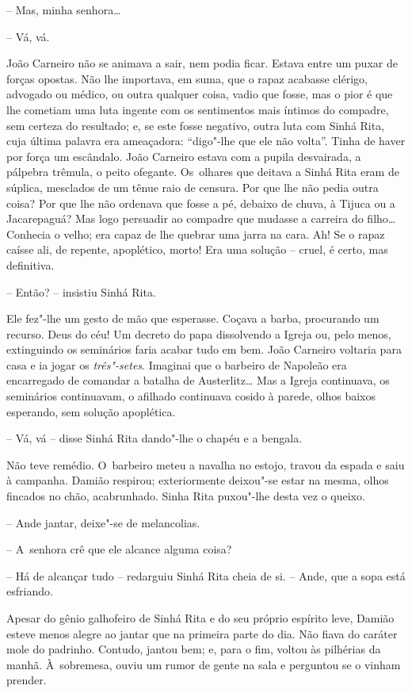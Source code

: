 -- Mas, minha senhora\ldots{}

-- Vá, vá.

João Carneiro não se animava a sair, nem podia ficar. Estava entre um
puxar de forças opostas. Não lhe importava, em suma, que o rapaz
acabasse clérigo, advogado ou médico, ou outra qualquer coisa, vadio que
fosse, mas o pior é que lhe cometiam uma luta ingente com os sentimentos
mais íntimos do compadre, sem certeza do resultado; e, se este fosse
negativo, outra luta com Sinhá Rita, cuja última palavra era ameaçadora:
``digo"-lhe que ele não volta''. Tinha de haver por força um escândalo.
João Carneiro estava com a pupila desvairada, a pálpebra trêmula, o
peito ofegante. Os~olhares que deitava a Sinhá Rita eram de súplica,
mesclados de um tênue raio de censura. Por que lhe não pedia outra
coisa? Por que lhe não ordenava que fosse a pé, debaixo de chuva, à
Tijuca ou a Jacarepaguá? Mas logo persuadir ao compadre que mudasse a
carreira do filho\ldots{} Conhecia o velho; era capaz de lhe quebrar uma
jarra na cara. Ah! Se o rapaz caísse ali, de repente, apoplético, morto!
Era uma solução -- cruel, é certo, mas definitiva.

-- Então? -- insistiu Sinhá Rita.

Ele fez"-lhe um gesto de mão que esperasse. Coçava a barba, procurando um
recurso. Deus do céu! Um decreto do papa dissolvendo a Igreja ou, pelo
menos, extinguindo os seminários faria acabar tudo em bem. João Carneiro
voltaria para casa e ia jogar os \emph{três"-setes}. Imaginai que o
barbeiro de Napoleão era encarregado de comandar a batalha de
Austerlitz\ldots{} Mas a Igreja continuava, os seminários continuavam, o
afilhado continuava cosido à parede, olhos baixos esperando, sem solução
apoplética.

-- Vá, vá -- disse Sinhá Rita dando"-lhe o chapéu e a bengala.

Não teve remédio. O~barbeiro meteu a navalha no estojo, travou da espada
e saiu à campanha. Damião respirou; exteriormente deixou"-se estar na
mesma, olhos fincados no chão, acabrunhado. Sinha Rita puxou"-lhe desta
vez o queixo.

-- Ande jantar, deixe"-se de melancolias.

-- A~senhora crê que ele alcance alguma coisa?

-- Há de alcançar tudo -- redarguiu Sinhá Rita cheia de si. -- Ande, que
a sopa está esfriando.

Apesar do gênio galhofeiro de Sinhá Rita e do seu próprio espírito leve,
Damião esteve menos alegre ao jantar que na primeira parte do dia. Não
fiava do caráter mole do padrinho. Contudo, jantou bem; e, para o fim,
voltou às pilhérias da manhã. À~sobremesa, ouviu um rumor de gente na
sala e perguntou se o vinham prender.

